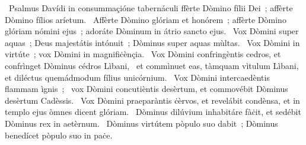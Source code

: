 {~Psalmus Davídi in consummaçióne tabernáculi}
{%
ffèrte Dòmino fílii Dei~; affèrte Dòmino fílios aríetum.
~Affèrte Dòmino glóriam et honórem~; affèrte Dòmino glóriam nómini ejus~; adoráte Dòminum in átrio sancto ejus.
~Vox Dòmini super aquas~; Deus majestátis intónuit~; Dòminus super aquas mùltas.
~Vox Dòmini in virtúte~; vox Dòmini in magnifiċènçia.
~Vox Dòmini confringèntis cedros, et confrìnget Dòminus cédros Lìbani,
~et commìnuet eas, tàmquam vìtulum Lìbani, et diléctus quemádmodum fílius unicórnium.
~Vox Dòmini intercaedèntis flammam ìgnis~;
~vox Dòmini concutièntis desèrtum, et commovébit Dòminus desèrtum Cadèssis.
~Vox Dòmini praeparàntis ċèrvos, et revelábit condènsa, et in templo ejus òmnes dicent glóriam.
~Dòminus dilúvium inhabitáre fàċit, et sedébit Dòminus rex in aetèrnum.
~Dòminus virtútem pòpulo suo dabit~; Dòminus benedícet pòpulo suo in paċe.
}
